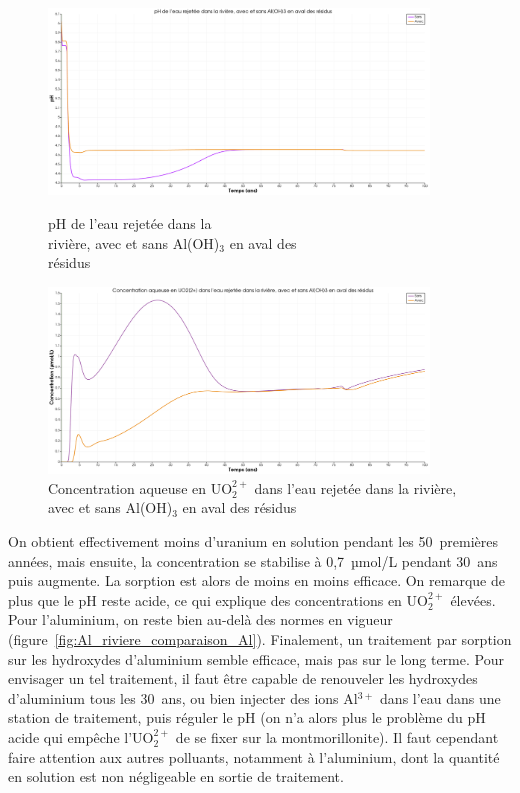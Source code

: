 \documentclass{article}
\begin{document}
\begin{figure}[tbh]
    \centering
    \begin{minipage}{0.5\textwidth}
        \centering
        \includegraphics[width=0.9\textwidth]{III_B_2_22.png} 
        \caption{pH de l'eau rejetée dans la \\rivière, avec et sans Al(OH)$_3$ en aval des \\résidus}
        \label{fig:pH_riviere_comparaison_Al}
    \end{minipage}\hfill
    \begin{minipage}{0.5\textwidth}
        \centering
        \includegraphics[width=0.9\textwidth]{III_B_2_23.png} 
        \caption{Concentration aqueuse en UO$_2^{2+}$ dans l'eau rejetée dans la rivière, avec et sans Al(OH)$_3$ en aval des résidus}
        \label{fig:UO2_riviere_comparaison_Al}
    \end{minipage}
\end{figure}


On obtient effectivement moins d’uranium en solution pendant les 50~premières années, mais ensuite, la concentration se stabilise à 0,7~µmol/L pendant 30~ans puis augmente. La sorption est alors de moins en moins efficace. On remarque de plus que le pH reste acide, ce qui explique des concentrations en UO$_2^{2+}$ élevées. Pour l’aluminium, on reste bien au-delà des normes en vigueur (figure~\ref{fig:Al_riviere_comparaison_Al}).
Finalement, un traitement par sorption sur les hydroxydes d’aluminium semble efficace, mais pas sur le long terme. Pour envisager un tel traitement, il faut être capable de renouveler les hydroxydes d’aluminium tous les 30~ans, ou bien injecter des ions Al$^{3+}$ dans l’eau dans une station de traitement, puis réguler le pH (on n’a alors plus le problème du pH acide qui empêche l’UO$_2^{2+}$ de se fixer sur la montmorillonite). Il faut cependant faire attention aux autres polluants, notamment à l’aluminium, dont la quantité en solution est non négligeable en sortie de traitement.
\end{document}
